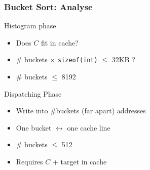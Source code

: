 \documentclass[xcolor={x11names,svgnames}]{beamer}
\begin{document}

\begin{frame}[fragile=singleslide]
  \frametitle{Bucket Sort: Analyse}


  \begin{exampleblock}{Histogram phase}
    \begin{itemize}
    \item Does $C$ fit in cache? 
    \item \# buckets $\times$ \texttt{sizeof(int)} $\leq$ 32KB ?
    \item \# buckets $\leq$ 8192 
    \end{itemize}
  \end{exampleblock}

  \medskip

  \begin{alertblock}{Dispatching Phase}
    \begin{itemize}
    \item Write into \#buckets (\alert{far apart}) addresses 
    \item One bucket $\leftrightarrow$ one cache line
    \item \# buckets $\leq$ 512 
    \item \scriptsize Requires $C$ + target in cache
    \end{itemize}
  \end{alertblock}  
\end{frame}

\end{document}
